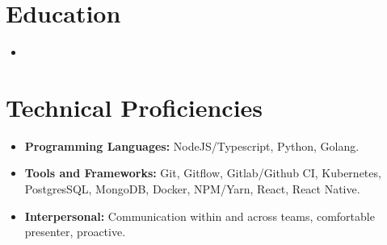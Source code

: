 \documentclass[11pt,a4paper,sans]{moderncv}        %
\begin{document}
\section{Education}

\vspace{5pt}

\begin{itemize}

\item{}

\end{itemize}

\vspace{2pt}

\section{Technical Proficiencies}

\vspace{4pt}

\begin{itemize}

\item \textbf{Programming Languages:} NodeJS/Typescript, Python, Golang.

\vspace{4pt}

\item \textbf{Tools and Frameworks:} Git, Gitflow, Gitlab/Github CI, Kubernetes, PostgresSQL, MongoDB, Docker, NPM/Yarn, React, React Native.

\vspace{4pt}

\item \textbf{Interpersonal:} Communication within and across teams, comfortable presenter, proactive.


\end{itemize}

\nocite{*}



\end{document}
